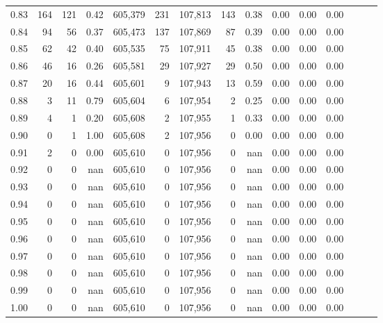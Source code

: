 \begin{tabular}{rrrrrrrrrrrrrrr}
0.83 &     164 &    121 &  0.42 &  605,379 &      231 &  107,813 &      143 &  0.38 &  0.00 &  0.00 &      0.00 \\
0.84 &      94 &     56 &  0.37 &  605,473 &      137 &  107,869 &       87 &  0.39 &  0.00 &  0.00 &      0.00 \\
0.85 &      62 &     42 &  0.40 &  605,535 &       75 &  107,911 &       45 &  0.38 &  0.00 &  0.00 &      0.00 \\
0.86 &      46 &     16 &  0.26 &  605,581 &       29 &  107,927 &       29 &  0.50 &  0.00 &  0.00 &      0.00 \\
0.87 &      20 &     16 &  0.44 &  605,601 &        9 &  107,943 &       13 &  0.59 &  0.00 &  0.00 &      0.00 \\
0.88 &       3 &     11 &  0.79 &  605,604 &        6 &  107,954 &        2 &  0.25 &  0.00 &  0.00 &      0.00 \\
0.89 &       4 &      1 &  0.20 &  605,608 &        2 &  107,955 &        1 &  0.33 &  0.00 &  0.00 &      0.00 \\
0.90 &       0 &      1 &  1.00 &  605,608 &        2 &  107,956 &        0 &  0.00 &  0.00 &  0.00 &      0.00 \\
0.91 &       2 &      0 &  0.00 &  605,610 &        0 &  107,956 &        0 &   nan &  0.00 &  0.00 &      0.00 \\
0.92 &       0 &      0 &   nan &  605,610 &        0 &  107,956 &        0 &   nan &  0.00 &  0.00 &      0.00 \\
0.93 &       0 &      0 &   nan &  605,610 &        0 &  107,956 &        0 &   nan &  0.00 &  0.00 &      0.00 \\
0.94 &       0 &      0 &   nan &  605,610 &        0 &  107,956 &        0 &   nan &  0.00 &  0.00 &      0.00 \\
0.95 &       0 &      0 &   nan &  605,610 &        0 &  107,956 &        0 &   nan &  0.00 &  0.00 &      0.00 \\
0.96 &       0 &      0 &   nan &  605,610 &        0 &  107,956 &        0 &   nan &  0.00 &  0.00 &      0.00 \\
0.97 &       0 &      0 &   nan &  605,610 &        0 &  107,956 &        0 &   nan &  0.00 &  0.00 &      0.00 \\
0.98 &       0 &      0 &   nan &  605,610 &        0 &  107,956 &        0 &   nan &  0.00 &  0.00 &      0.00 \\
0.99 &       0 &      0 &   nan &  605,610 &        0 &  107,956 &        0 &   nan &  0.00 &  0.00 &      0.00 \\
1.00 &       0 &      0 &   nan &  605,610 &        0 &  107,956 &        0 &   nan &  0.00 &  0.00 &      0.00 \\
\bottomrule
\end{tabular}
